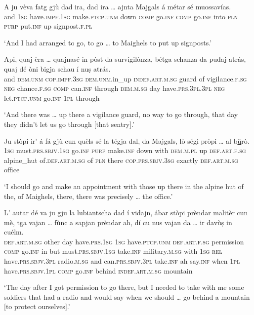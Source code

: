 \begin{linenumbers}
\gll A ju vèva fatg gjù dad ira, dad ira … ajnta Majgals á métar sé muossavías.\\
and \textsc{1sg} have.\textsc{impf.1sg} make.\textsc{ptcp.unm} down \textsc{comp}  go.\textsc{inf} \textsc{comp} go.\textsc{inf} {} into \textsc{pln} \textsc{purp} put.\textsc{inf} up signpost.\textsc{f.pl} \\
\end{linenumbers}
\medskip
\glt `And I had arranged to go, to go … to Maighels to put up signposts.'
\medskip

\begin{linenumbers}
\gll  Api, quaj èra … quajnasé in pòst da survigilònza, bétga schanza da pudaj atrás, quaj dé òni bigja schau í nuṣ atrás.\\
and \textsc{dem.unm} \textsc{cop.impf.3sg} {} \textsc{dem.unm}.in\_up \textsc{indef.art.m.sg} guard of vigilance.\textsc{f.sg} \textsc{neg} chance.\textsc{f.sg} \textsc{comp} can.\textsc{inf} through \textsc{dem.m.sg} day have.\textsc{prs.3pl.3pl} \textsc{neg} let.\textsc{ptcp.unm} go.\textsc{inf} \textsc{1pl} through  \\
\end{linenumbers}
\medskip
\glt `And there was … up there a vigilance guard, no way to go through, that day they didn’t let us go through [that sentry].'
\medskip

\begin{linenumbers}
\gll Ju stòpi ir’ á fá gjù cun quèls sé la tégja dal, da Majgals, lò ségi pròpi … al b\underline{ü}rò.   \\
 \textsc{1sg} must.\textsc{prs.sbjv.1sg} go.\textsc{inf} \textsc{purp} make.\textsc{inf} down with \textsc{dem.m.pl} up \textsc{def.art.f.sg} alpine\_hut of.\textsc{def.art.m.sg} of \textsc{pln} there \textsc{cop.prs.sbjv.3sg} exactly  {} \textsc{def.art.m.sg} office\\
\end{linenumbers}
\medskip
\glt `I should go and make an appointment with those up there in the alpine hut of the, of Maighels, there, there was precisely … the office.'
\medskip

\begin{linenumbers}
\gll  L’ autar dé va ju gju la lubiantscha dad í vidajn, ábar stòpi prèndar malitèr cun mè, tga vajan … fùnc a sapjan prèndar ah, dí cu nus vajan da … ir davùṣ in cuélm.  \\
 \textsc{def.art.m.sg} other day have.\textsc{prs.1sg} \textsc{1sg} have.\textsc{ptcp.unm} \textsc{def.art.f.sg} permission \textsc{comp} go.\textsc{inf} in but must.\textsc{prs.sbjv.1sg}  take.\textsc{inf} military.\textsc{m.sg} with \textsc{1sg} \textsc{rel} have.\textsc{prs.sbjv.3pl} {} radio.\textsc{m.sg} and can.\textsc{prs.sbjv.3pl} take.\textsc{inf} ah say.\textsc{inf} when \textsc{1pl} have.\textsc{prs.sbjv.1pl} \textsc{comp} {} go.\textsc{inf} behind \textsc{indef.art.m.sg} mountain\\
\end{linenumbers}
\medskip
\glt `The day after I got permission to go there, but I needed to take with me some soldiers that had a radio and would say when we should … go behind a mountain [to protect ourselves].'
\medskip

